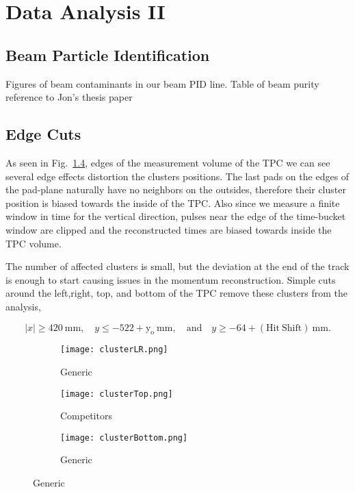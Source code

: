 \chapter{Data Analysis II}

\section{Beam Particle Identification}
Figures of beam contaminants in our beam PID line. 
Table of beam purity reference to Jon's thesis paper

\section{Edge Cuts}
As seen in Fig.~\ref{fig:edge}, edges of the measurement volume of the TPC we can see several edge effects distortion the clusters positions. The last pads on the edges of the pad-plane naturally have no neighbors on the outsides, therefore their cluster position is biased towards the inside of the TPC. Also since we measure a finite window in time for the vertical direction, pulses near the edge of the time-bucket window are clipped and the reconstructed times are biased towards inside the TPC volume. 

The number of affected clusters is small, but the deviation at the end of the track is enough to start causing issues in the momentum reconstruction. Simple cuts around the left,right, top, and bottom of the TPC remove these clusters from the analysis,

\begin{equation*}
  |x|\geq420~\mathrm{mm},\quad y\leq-522+\mathrm{y_o}~\mathrm{mm},
  \quad\mathrm{and}\quad y\geq-64+\mathrm{(Hit\ Shift)}~\mathrm{mm}.
\label{eq:hitshift}
\end{equation*}

\begin{figure}[!htb]
    \centering
    \begin{subfigure}[t]{0.45\textwidth}
        \centering
        \texttt{[image: clusterLR.png]} 
        \caption{Generic} \label{fig:mom_S_before}
    \end{subfigure}
    \hfill
    \begin{subfigure}[t]{0.45\textwidth}
        \centering
        \texttt{[image: clusterTop.png]} 
        \caption{Competitors} \label{fig:mom_L_before}
    \end{subfigure}
    
    \begin{subfigure}[t]{0.45\textwidth}
        \centering
        \texttt{[image: clusterBottom.png]} 
        \caption{Generic} \label{fig:mom_S_after}
    \end{subfigure}
   
\label{fig:edge}
\end{figure}

